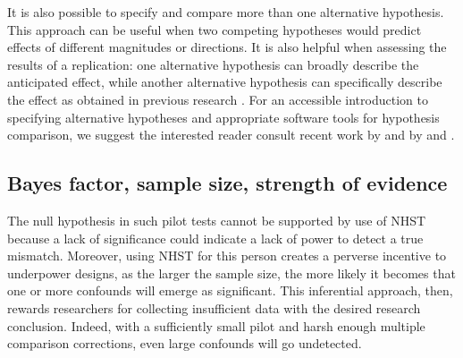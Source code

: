 \documentclass[man]{apa6}
\begin{document}
It is also possible to specify and compare more than one alternative hypothesis. This approach can be useful when two competing hypotheses would predict effects of different magnitudes or directions. It is also helpful when assessing the results of a replication: one alternative hypothesis can broadly describe the anticipated effect, while another alternative hypothesis can specifically describe the effect as obtained in previous research \citep[see][for an example]{Boekel:etal:2014}. %
For an accessible introduction to specifying alternative hypotheses and appropriate software tools for hypothesis comparison, we suggest the interested reader consult recent work by \citet{Dienes:2011,Dienes:2014} and by \citet{Rouder:Morey:2012} and \citet{Rouder:etal:2012}.

\subsection{Bayes factor, sample size, strength of evidence}

The null hypothesis in such pilot tests cannot be supported by use of NHST because a lack of significance could indicate a lack of power to detect a true mismatch. Moreover, using NHST for this person creates a perverse incentive to underpower designs, as the larger the sample size, the more likely it becomes that one or more confounds will emerge as significant. This inferential approach, then, rewards researchers for collecting insufficient data with the desired research conclusion. Indeed, with a sufficiently small pilot and harsh enough multiple comparison corrections, even large confounds will go undetected.
\end{document}
